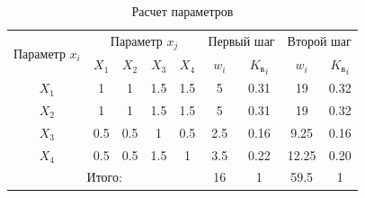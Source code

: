 \documentclass[oneside,a4paper,14pt,final]{extreport}
\begin{document}
\begin{table}[ht]
\caption{Расчет параметров}
\label{tab_weight}
\centering
    \begin{tabular}{|c|c|c|c|c|c|c|c|c|}
    \hline \multirow{2}{*}{Параметр $x_i$} & \multicolumn{4}{c|}{Параметр $x_j$} &
        \multicolumn{2}{c|}{Первый шаг} & \multicolumn{2}{c|}{Второй шаг} \\
    \cline{2-9} & $X_1$ & $X_2$ & $X_3$ & $X_4$ & $w_i$ &
        ${K_\text{в}}_i$ & $w_i$ & ${K_\text{в}}_i$ \\
    \hline $X_1$ & 1 & 1 & 1.5 & 1.5 & 5 & 0.31 & 19 & 0.32 \\
    \hline $X_2$ & 1 & 1 & 1.5 & 1.5 & 5 & 0.31 & 19 & 0.32 \\
    \hline $X_3$ & 0.5 & 0.5 & 1 & 0.5 & 2.5 & 0.16 & 9.25 & 0.16 \\
    \hline $X_4$ & 0.5 & 0.5 & 1.5 & 1 & 3.5 & 0.22 & 12.25 & 0.20 \\
    \hline \multicolumn{5}{|c|}{Итого:} & 16 & 1 & 59.5 & 1 \\
    \hline
    \end{tabular}
\end{table}
\end{document}
